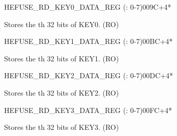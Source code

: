 \begin{register}{H}{EFUSE\_RD\_KEY0\_DATA\_REG (: 0-7)}{\hexprefix{}009C+4*}\label{regdesc:EFUSERDKEY0DATANREG}
%
\regnewline%
\begin{regdesc}\begin{reglist}
\label{fielddesc:EFUSEKEY0DATAN}\item [EFUSE\_KEY0\_DATA\regindex{n}] Stores the th 32 bits of KEY0. (RO)
\end{reglist}\end{regdesc}
\end{register}


\begin{register}{H}{EFUSE\_RD\_KEY1\_DATA\_REG (: 0-7)}{\hexprefix{}00BC+4*}\label{regdesc:EFUSERDKEY1DATANREG}
%
\regnewline%
\begin{regdesc}\begin{reglist}
\label{fielddesc:EFUSEKEY1DATAN}\item [EFUSE\_KEY1\_DATA\regindex{n}] Stores the th 32 bits of KEY1. (RO)
\end{reglist}\end{regdesc}
\end{register}


\begin{register}{H}{EFUSE\_RD\_KEY2\_DATA\_REG (: 0-7)}{\hexprefix{}00DC+4*}\label{regdesc:EFUSERDKEY2DATANREG}
%
\regnewline%
\begin{regdesc}\begin{reglist}
\label{fielddesc:EFUSEKEY2DATAN}\item [EFUSE\_KEY2\_DATA\regindex{n}] Stores the th 32 bits of KEY2. (RO)
\end{reglist}\end{regdesc}
\end{register}


\begin{register}{H}{EFUSE\_RD\_KEY3\_DATA\_REG (: 0-7)}{\hexprefix{}00FC+4*}\label{regdesc:EFUSERDKEY3DATANREG}
%
\regnewline%
\begin{regdesc}\begin{reglist}
\label{fielddesc:EFUSEKEY3DATAN}\item [EFUSE\_KEY3\_DATA\regindex{n}] Stores the th 32 bits of KEY3. (RO)
\end{reglist}\end{regdesc}
\end{register}


